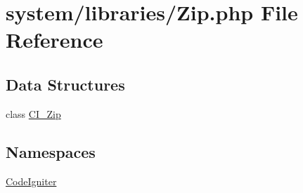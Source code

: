 \hypertarget{_zip_8php}{}\section{system/libraries/\+Zip.php File Reference}
\label{_zip_8php}
\subsection*{Data Structures}
\begin{DoxyCompactItemize}
\item 
class \mbox{\hyperlink{class_c_i___zip}{C\+I\+\_\+\+Zip}}
\end{DoxyCompactItemize}
\subsection*{Namespaces}
\begin{DoxyCompactItemize}
\item 
 \mbox{\hyperlink{namespace_code_igniter}{Code\+Igniter}}
\end{DoxyCompactItemize}
